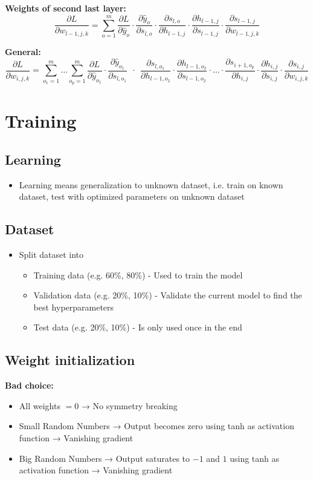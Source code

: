 \documentclass[10pt,a4paper]{article}
\begin{document}
\textbf{Weights of second last layer:}
$$
	\frac{\partial L}{\partial w_{l-1,j,k}} = \sum_{o = 1}^m \frac{\partial L}{\partial \hat y_o} ⋅ \frac{\partial \hat y_o}{\partial s_{l,o}} ⋅ \frac{\partial s_{l,o}}{\partial h_{l-1, j}} ⋅ \frac{\partial h_{l-1, j}}{\partial s_{l-1,j}} ⋅ \frac{\partial s_{l-1,j}}{\partial w_{l-1,j,k}}
$$

\textbf{General:}
$$
	\frac{\partial L}{\partial w_{i,j,k}} = \sum_{o_1 = 1}^m \dots \sum_{o_p = 1}^m \frac{\partial L}{\partial \hat y_{o_1}} ⋅ \frac{\partial \hat y_{o_1}}{\partial s_{l,o_1}} ~~⋅~~ \frac{\partial s_{l,o_1}}{\partial h_{l-1, o_2}} ⋅ \frac{\partial h_{l-1, o_2}}{\partial s_{l-1,o_2}} ⋅ \dots ⋅ \frac{\partial s_{i+1,o_p}}{\partial h_{i, j}} ⋅\frac{\partial h_{i, j}}{\partial s_{i,j}} ⋅ \frac{\partial s_{i,j}}{\partial w_{i,j,k}}
$$

\pagebreak

\section{Training}
\subsection{Learning}
\begin{itemize}
	\item Learning means generalization to unknown dataset, i.e. train on known dataset, test with optimized parameters on unknown dataset
\end{itemize}

\subsection{Dataset}
\begin{itemize}
	\item Split dataset into
	\begin{itemize}
		\item Training data (e.g. 60\%, 80\%) - Used to train the model
		\item Validation data (e.g. 20\%, 10\%) - Validate the current model to find the best hyperparameters
		\item Test data (e.g. 20\%, 10\%) - Is only used once in the end
	\end{itemize}
\end{itemize}

\subsection{Weight initialization}
\textbf{Bad choice:} \\
\begin{itemize}
	\item All weights $= 0$ → No symmetry breaking
	\item Small Random Numbers → Output becomes zero using tanh as activation function → Vanishing gradient
	\item Big Random Numbers → Output saturates to $-1$ and $1$ using tanh as activation function → Vanishing gradient
\end{itemize}
\end{document}
